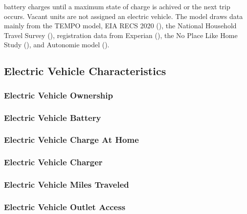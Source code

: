 battery charges until a maximum state of charge is achived or the next trip occurs. Vacant units are not assigned an electric vehicle. The model draws data mainly from the TEMPO model, EIA RECS 2020 (\cite{RECS2020}), the National Household Travel Survey (\cite{NHTS2017,NHTS2022}), registration data from Experian (\cite{EXPERIAN2023}), the No Place Like Home Study (\cite{NPLH2021}), and Autonomie model (\cite{AUTONOMIE}).

\subsection{Electric Vehicle Characteristics}
\subsubsection{Electric Vehicle Ownership}


\subsubsection{Electric Vehicle Battery}


\subsubsection{Electric Vehicle Charge At Home}


\subsubsection{Electric Vehicle Charger}


\subsubsection{Electric Vehicle Miles Traveled}


\subsubsection{Electric Vehicle Outlet Access}


